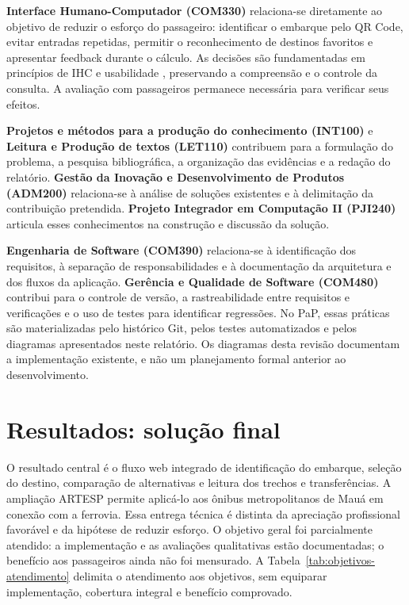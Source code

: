 \documentclass[12pt,oneside,a4paper,brazil,chapter=TITLE]{abntex2}
\begin{document}
\textbf{Interface Humano-Computador (COM330)} relaciona-se diretamente ao objetivo de reduzir o esforço do passageiro: identificar o embarque pelo QR Code, evitar entradas repetidas, permitir o reconhecimento de destinos favoritos e apresentar feedback durante o cálculo. As decisões são fundamentadas em princípios de IHC e usabilidade \citep{barbosa2021,nielsen1994,iso924111}, preservando a compreensão e o controle da consulta. A avaliação com passageiros permanece necessária para verificar seus efeitos.

\textbf{Projetos e métodos para a produção do conhecimento (INT100)} e \textbf{Leitura e Produção de textos (LET110)} contribuem para a formulação do problema, a pesquisa bibliográfica, a organização das evidências e a redação do relatório. \textbf{Gestão da Inovação e Desenvolvimento de Produtos (ADM200)} relaciona-se à análise de soluções existentes e à delimitação da contribuição pretendida. \textbf{Projeto Integrador em Computação II (PJI240)} articula esses conhecimentos na construção e discussão da solução.

\textbf{Engenharia de Software (COM390)} relaciona-se à identificação dos requisitos, à separação de responsabilidades e à documentação da arquitetura e dos fluxos da aplicação. \textbf{Gerência e Qualidade de Software (COM480)} contribui para o controle de versão, a rastreabilidade entre requisitos e verificações e o uso de testes para identificar regressões. No PaP, essas práticas são materializadas pelo histórico Git, pelos testes automatizados e pelos diagramas apresentados neste relatório. Os diagramas desta revisão documentam a implementação existente, e não um planejamento formal anterior ao desenvolvimento.



\chapter{Resultados: solução final}
O resultado central é o fluxo web integrado de identificação do embarque, seleção do destino, comparação de alternativas e leitura dos trechos e transferências. A ampliação ARTESP permite aplicá-lo aos ônibus metropolitanos de Mauá em conexão com a ferrovia. Essa entrega técnica é distinta da apreciação profissional favorável e da hipótese de reduzir esforço. O objetivo geral foi parcialmente atendido: a implementação e as avaliações qualitativas estão documentadas; o benefício aos passageiros ainda não foi mensurado. A Tabela~\ref{tab:objetivos-atendimento} delimita o atendimento aos objetivos, sem equiparar implementação, cobertura integral e benefício comprovado.
\end{document}
